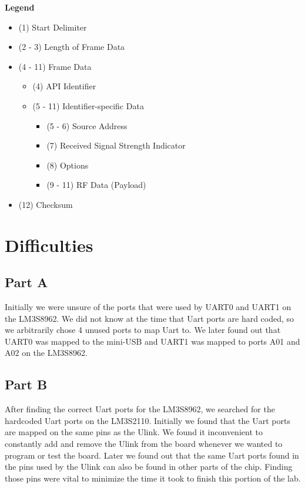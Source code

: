 \documentclass[11pt, titlepage]{article}
\begin{document}
            \textbf{Legend}
            \begin{itemize}
                \item (1) Start Delimiter
                \item (2 - 3) Length of Frame Data
                \item (4 - 11) Frame Data
                    \begin{itemize}
                        \item (4) API Identifier
                        \item (5 - 11) Identifier-specific Data
                            \begin{itemize}
                                \item (5 - 6) Source Address
                                \item (7) Received Signal Strength Indicator
                                \item (8) Options
                                \item (9 - 11) RF Data (Payload)
                            \end{itemize}
                    \end{itemize}
                \item (12) Checksum
            \end{itemize}
    
    \section{Difficulties}
        \subsection{Part A}
            Initially we were unsure of the ports that were used by UART0 and UART1 on the LM3S8962. We did not know at the time that Uart ports are hard coded, so we arbitrarily chose 4 unused ports to map Uart to. We later found out that UART0 was mapped to the mini-USB and UART1 was mapped to ports A01 and A02 on the LM3S8962.
            
        \subsection{Part B}
            After finding the correct Uart ports for the LM3S8962, we searched for the hardcoded Uart ports on the LM3S2110. Initially we found that the Uart ports are mapped on the same pins as the Ulink. We found it inconvenient to constantly add and remove the Ulink from the board whenever we wanted to program or test the board. Later we found out that the same Uart ports found in the pins used by the Ulink can also be found in other parts of the chip. Finding those pins were vital to minimize the time it took to finish this portion of the lab.
        
\end{document}
